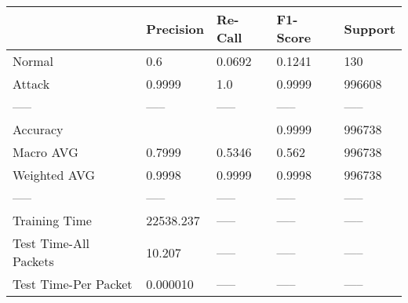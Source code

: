 \begin{tabular}{lllll}
\toprule
{} &  Precision & Re-Call & F1-Score & Support \\
\midrule
Normal                &        0.6 &  0.0692 &   0.1241 &     130 \\
Attack                &     0.9999 &     1.0 &   0.9999 &  996608 \\
-----                 &      ----- &   ----- &    ----- &   ----- \\
Accuracy              &            &         &   0.9999 &  996738 \\
Macro AVG             &     0.7999 &  0.5346 &    0.562 &  996738 \\
Weighted AVG          &     0.9998 &  0.9999 &   0.9998 &  996738 \\
-----                 &      ----- &   ----- &    ----- &   ----- \\
Training Time         &  22538.237 &   ----- &    ----- &   ----- \\
Test Time-All Packets &     10.207 &   ----- &    ----- &   ----- \\
Test Time-Per Packet  &   0.000010 &   ----- &    ----- &   ----- \\
\bottomrule
\end{tabular}
